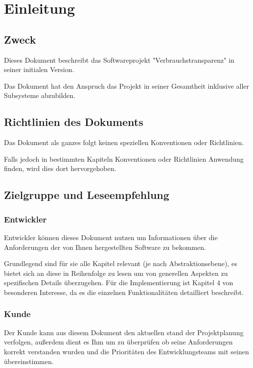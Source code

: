 \section{Einleitung}
\subsection{Zweck}
Dieses Dokument beschreibt das Softwareprojekt "Verbrauchstransparenz" in seiner initialen Version.

Das Dokument hat den Anspruch das Projekt in seiner Gesamtheit inklusive aller Subsysteme abzubilden.

\subsection{Richtlinien des Dokuments}
Das Dokument als ganzes folgt keinen speziellen Konventionen oder Richtlinien. 

Falls jedoch in bestimmten Kapiteln Konventionen oder Richtlinien Anwendung finden, wird dies dort hervorgehoben. 

\subsection{Zielgruppe und Leseempfehlung}
\subsubsection{Entwickler}

Entwickler können dieses Dokument nutzen um Informationen über die Anforderungen der von Ihnen hergestellten Software zu bekommen. 

Grundlegend sind für sie alle Kapitel relevant (je nach Abstraktionsebene), es bietet sich an diese in Reihenfolge zu lesen um von generellen Aspekten zu spezifischen Details überzugehen. Für die Implementierung ist Kapitel 4 von besonderen Interesse, da es die einzelnen Funktionalitäten detailliert beschreibt.

\subsubsection{Kunde}

Der Kunde kann aus diesem Dokument den aktuellen stand der Projektplanung verfolgen, außerdem dient es Ihm um zu überprüfen ob seine Anforderungen korrekt verstanden wurden und die Prioritäten des Entwicklungsteams mit seinen übereinstimmen.

